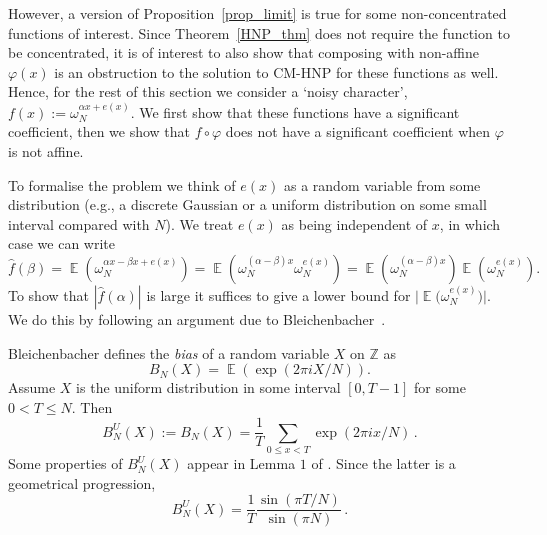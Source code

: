 \documentclass[11pt]{article}
\theoremstyle{definition}
\newcommand{\Z}{\mathbb{Z}}
\DeclareMathOperator*{\E}{\mathbb{E}}
\begin{document}
However, a version of Proposition~\ref{prop_limit} is true for some non-concentrated functions of interest. Since Theorem~\ref{HNP_thm} does not require the function to be concentrated, it is of interest to also show that composing with non-affine $\varphi(x)$ is an obstruction to the solution to CM-HNP for these functions as well.
Hence, for the rest of this section we consider a `noisy character', $f(x) := \omega_N^{\alpha x + e(x)}$.
We first show that these functions have a significant coefficient, then we show that $f \circ \varphi$ does not have a significant coefficient when $\varphi$ is not affine.



To formalise the problem we think of $e(x)$ as a random variable from some distribution (e.g., a discrete Gaussian or a uniform distribution on some small interval compared with $N$).
%
We treat $e(x)$ as being independent of $x$, in which case we can write
\[
    \widehat{f}(\beta)=\E\left(\omega_N^{\alpha x -\beta x + e(x)}\right)=\E\left(\omega_N^{( \alpha - \beta) x }\omega_N^{e(x)}\right)= \E\left(\omega_N^{( \alpha - \beta)x}\right)\E\left(\omega_N^{e(x)}\right) .
\]
To show that $|\widehat{f}(\alpha)|$ is large it suffices to give a lower bound for $ \big| \E\big(\omega_N^{e(x)}\big) \big|$.
We do this by following an argument due to Bleichenbacher~\cite{Bleichenbacher}.


Bleichenbacher defines the \emph{bias} of a random variable $X$ on $\Z$ as
\[
    B_N(X) = \E\left( \exp( 2\pi i X / N ) \right) .
\]
Assume $X$ is the uniform distribution in some interval $[0,T-1]$ for some $0<T\leq N$.
Then
\[ B^U_N(X) := B_N(X)  = \frac{1}{T}\sum_{0\leq x<T}\exp( 2\pi i x / N ) \,. \]
Some properties of $B^U_N(X)$ appear in Lemma $1$ of \cite{De-Mulder}. Since the latter is a geometrical progression,
\[ B^U_N(X) = \frac{1}{T}\frac{\sin(\pi T /N)}{\sin(\pi N)} \,. \]
\end{document}
